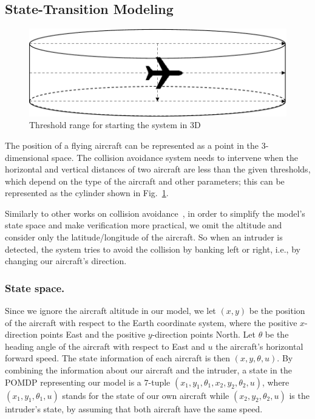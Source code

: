 \documentclass[orivec]{llncs}
\begin{document}
\subsection{State-Transition Modeling}
\label{ssec:stateTransitionModeling}

\begin{figure}[t] 
	\centering
	\includegraphics[width=0.40\linewidth]{3dsystem}
	\caption{Threshold range for starting the system in 3D}
	\label{fig:3dsystem}
\end{figure}
The position of a flying aircraft can be represented as a point in the 3-dimensional space.
The collision avoidance system needs to intervene when the horizontal and vertical distances of two aircraft are less than the given thresholds, which depend on the type of the aircraft and other parameters; 
this can be represented as the cylinder shown in Fig.~\ref{fig:3dsystem}.

Similarly to other works on collision avoidance~\cite{25,ACASX}, in order to simplify the model's state space and make verification more practical, we omit the altitude and consider only the latitude/longitude of the aircraft.
So when an intruder is detected, the system tries to avoid the collision by banking left or right, i.e., by changing our aircraft's direction.


\subsubsection{State space.}
Since we ignore the aircraft altitude in our model, we let $(x, y)$ be the position of the aircraft with respect to the Earth coordinate system, where the positive $x$-direction points East and the positive $y$-direction points North.
Let $\theta$ be the heading angle of the aircraft with respect to East and $u$ the aircraft's horizontal forward speed.
The state information of each aircraft is then $(x, y, \theta, u)$.
By combining the information about our aircraft and the intruder, a state in the POMDP representing our model is a $7$-tuple $(x_{1}, y_{1}, \theta_{1}, x_{2}, y_{2}, \theta_{2}, u)$, where $(x_{1}, y_{1}, \theta_{1}, u)$ stands for the state of our own aircraft while $(x_{2}, y_{2}, \theta_{2}, u)$ is the intruder's state, by assuming that both aircraft have the same speed.
\end{document}
